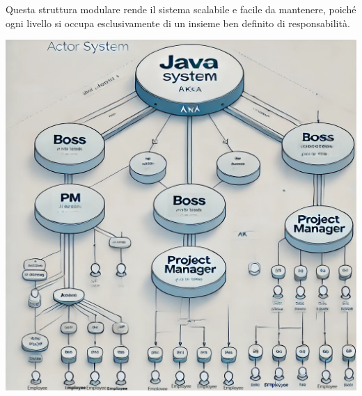 Questa struttura modulare rende il sistema scalabile e facile da mantenere, poiché ogni livello si occupa esclusivamente di un insieme ben definito di responsabilità.



\includegraphics[width=15cm]{report/img/chaGpt-graph.png}\\[0.5cm]